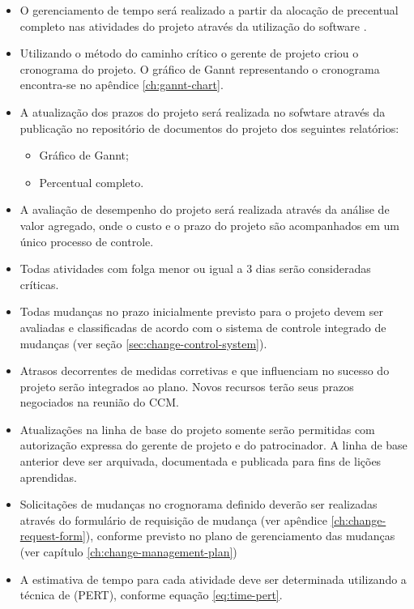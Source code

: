 \begin{itemize}
	\item O gerenciamento de tempo será realizado a partir da alocação de precentual completo nas atividades do projeto através da utilização do software \projectManagementSoftwareName{}.
	\item Utilizando o método do caminho crítico o gerente de projeto criou o cronograma do projeto. O gráfico de Gannt representando o cronograma encontra-se no apêndice \ref{ch:gannt-chart}.
	\item A atualização dos prazos do projeto será realizada no sofwtare \projectManagementSoftwareName{} através da publicação no repositório de documentos do projeto dos seguintes relatórios:
	      \begin{itemize}
		      \item Gráfico de Gannt;
		      \item Percentual completo.
	      \end{itemize}
	\item A avaliação de desempenho do projeto será realizada através da análise de valor agregado, onde o custo e o prazo do projeto são acompanhados em um único processo de controle.
	\item Todas atividades com folga menor ou igual a 3 dias serão consideradas críticas.
	\item Todas mudanças no prazo inicialmente previsto para o projeto devem ser avaliadas e classificadas de acordo com o sistema de controle integrado de mudanças (ver seção \ref{sec:change-control-system}).
	\item Atrasos decorrentes de medidas corretivas e que influenciam no sucesso do projeto serão integrados ao plano. Novos recursos terão seus prazos negociados na reunião do CCM.
	\item Atualizações na linha de base do projeto somente serão permitidas com autorização expressa do gerente de projeto e do patrocinador. A linha de base anterior deve ser arquivada, documentada e publicada para fins de lições aprendidas.
	\item Solicitações de mudanças no crognorama definido deverão ser realizadas através do formulário de requisição de mudança (ver apêndice \ref{ch:change-request-form}), conforme previsto no plano de gerenciamento das mudanças (ver capítulo \ref{ch:change-management-plan})
	\item A estimativa de tempo para cada atividade deve ser determinada utilizando a técnica de  (PERT), conforme equação \ref{eq:time-pert}.


\end{itemize}

